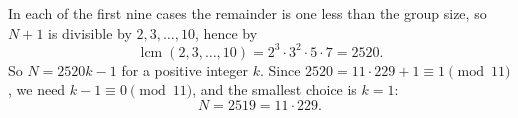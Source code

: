 In each of the first nine cases the remainder is one less than the group size, so $N+1$ is divisible by $2,3,\dots,10$, hence by
\[
\operatorname{lcm}(2,3,\dots,10)=2^3\cdot3^2\cdot5\cdot7=2520 .
\]
So $N=2520k-1$ for a positive integer $k$. Since $2520=11\cdot229+1\equiv1\pmod{11}$, we need $k-1\equiv0\pmod{11}$, and the smallest choice is $k=1$:
\[
N=\boxed{2519}=11\cdot229 .
\]

